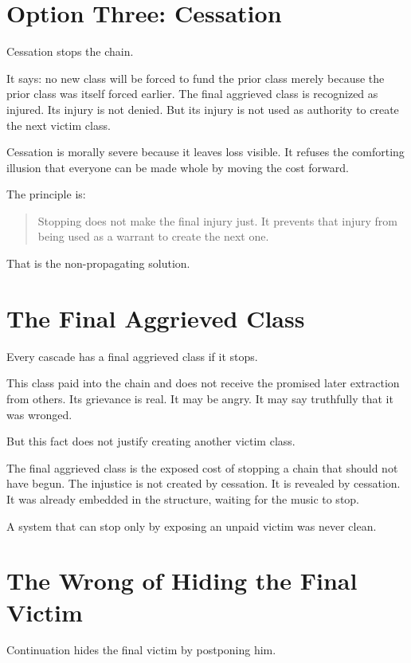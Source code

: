\documentclass[12pt]{article}
\begin{document}
\section{Option Three: Cessation}

Cessation stops the chain.

It says: no new class will be forced to fund the prior class merely because the prior class was itself forced earlier. The final aggrieved class is recognized as injured. Its injury is not denied. But its injury is not used as authority to create the next victim class.

Cessation is morally severe because it leaves loss visible. It refuses the comforting illusion that everyone can be made whole by moving the cost forward.

The principle is:

\begin{quote}
Stopping does not make the final injury just. It prevents that injury from being used as a warrant to create the next one.
\end{quote}

That is the non-propagating solution.

\section{The Final Aggrieved Class}

Every cascade has a final aggrieved class if it stops.

This class paid into the chain and does not receive the promised later extraction from others. Its grievance is real. It may be angry. It may say truthfully that it was wronged.

But this fact does not justify creating another victim class.

The final aggrieved class is the exposed cost of stopping a chain that should not have begun. The injustice is not created by cessation. It is revealed by cessation. It was already embedded in the structure, waiting for the music to stop.

A system that can stop only by exposing an unpaid victim was never clean.

\section{The Wrong of Hiding the Final Victim}

Continuation hides the final victim by postponing him.
\end{document}
